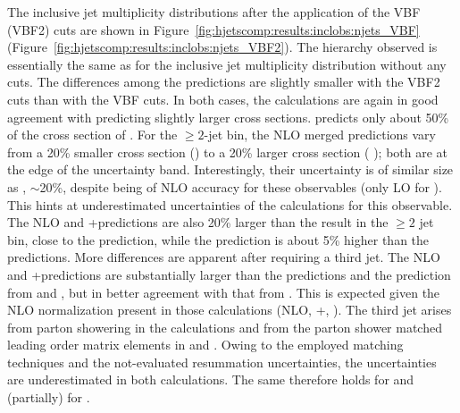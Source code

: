 The inclusive jet multiplicity distributions after the application of
the VBF (VBF2) cuts are shown in
Figure~\ref{fig:hjetscomp:results:inclobs:njets_VBF}
(Figure~\ref{fig:hjetscomp:results:inclobs:njets_VBF2}).  The
hierarchy observed is essentially the same as for the inclusive jet
multiplicity distribution without any cuts. The differences among the
predictions are slightly smaller with the VBF2 cuts than with the VBF
cuts.  In both cases, the \NNLOPS calculations are again in good 
agreement with \Sherpa \NNLOPS predicting slightly larger cross sections.
\Hej predicts only about 50\% of the cross section of \NNLOPS.
For the $\ge2$-jet bin, the NLO merged predictions vary from a 20\%
smaller cross section (\MGaMC) to a 20\% larger cross section (\Sherpa
\MEPSatNLO); both are at the edge of the \NNLOPS uncertainty
band. Interestingly, their uncertainty is of similar size as \NNLOPS,
$\sim$20\%, despite being of NLO accuracy for these observables (only
LO for \NNLOPS). This hints at underestimated uncertainties of the
\NNLOPS calculations for this observable. The NLO and \Minlo
\GoSam{}+\Sherpa predictions are also 20\% larger than the \NNLOPS
result in the $\ge2$ jet bin, close to the \Sherpa \MEPSatNLO
prediction, while the \Loopsim prediction is about 5\% higher than the
\NNLOPS predictions.
More differences are apparent after requiring a third jet. The NLO and
\Minlo \GoSam{}+\Sherpa predictions are substantially larger than the
\NNLOPS predictions and the prediction from \MGaMC and \Herwig, but in better
agreement with that from \Sherpa \MEPSatNLO. This is expected given
the NLO normalization present in those calculations (NLO,\Minlo
\GoSam{}+\Sherpa, \Sherpa \MEPSatNLO). The third jet arises from parton
showering in the \NNLOPS calculations and from the parton shower matched 
leading order matrix elements in \MGaMC and \Herwig. Owing to the employed 
matching techniques and the not-evaluated resummation uncertainties, 
the uncertainties are underestimated in both calculations. The same 
therefore holds for \Powheg \NNLOPS and (partially) for \Sherpa 
\NNLOPS. 

